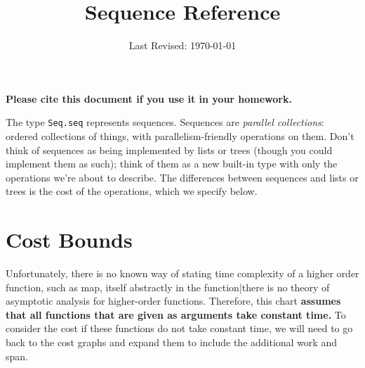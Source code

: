 \documentclass{article}
\title{Sequence Reference}
\date{Last Revised: \today}
\begin{document}
\maketitle

\textbf{Please cite this document if you use it in your homework.}

\bigskip

The type \verb|Seq.seq| represents sequences.  Sequences are
\emph{parallel collections}: ordered collections of things, with
parallelism-friendly operations on them.  Don't think of sequences as
being implemented by lists or trees (though you could implement them as
such); think of them as a new built-in type with only the operations
we're about to describe.  The differences between sequences and lists or
trees is the cost of the operations, which we specify below.




\newpage
\section{Cost Bounds}
Unfortunately, there is no known way of stating time complexity of a higher
order function, such as map, itself
abstractly in the function|there is no theory of asymptotic analysis for
higher-order functions.  Therefore, this chart \textbf{assumes
that all functions that are given as arguments take constant time.}
To consider the cost if these functions do not take constant time, we will
need to go back to the cost graphs and expand them to include the
additional work and span.
\end{document}

